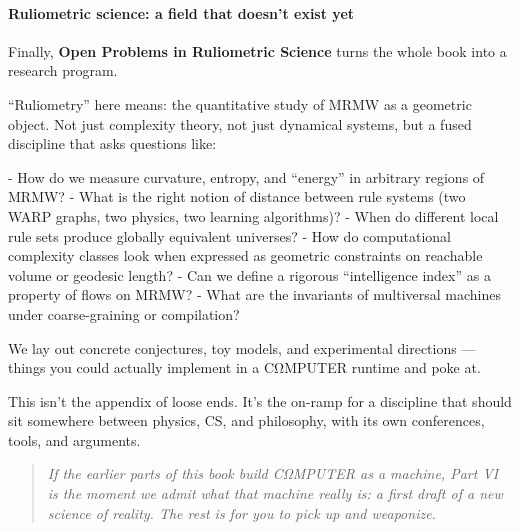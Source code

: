\paragraph{Ruliometric science: a field that doesn’t exist yet}

Finally, \textbf{Open Problems in Ruliometric Science} turns the whole book into a research program.

“Ruliometry” here means: the quantitative study of MRMW as a geometric object. Not just complexity theory, not just dynamical systems, but a fused discipline that asks questions like:

- How do we measure curvature, entropy, and “energy” in arbitrary regions of MRMW?
- What is the right notion of distance between rule systems (two WARP graphs, two physics, two learning algorithms)?
- When do different local rule sets produce globally equivalent universes?
- How do computational complexity classes look when expressed as geometric constraints on reachable volume or geodesic length?
- Can we define a rigorous “intelligence index” as a property of flows on MRMW?
- What are the invariants of multiversal machines under coarse-graining or compilation?

We lay out concrete conjectures, toy models, and experimental directions — things you could actually implement in a CΩMPUTER runtime and poke at.

This isn’t the appendix of loose ends. It’s the on-ramp for a discipline that should sit somewhere between physics, CS, and philosophy, with its own conferences, tools, and arguments.

\begin{quote}
\emph{If the earlier parts of this book build CΩMPUTER as a machine, Part VI is the moment we admit what that machine really is: a first draft of a new science of reality. The rest is for you to pick up and weaponize.}
\end{quote}
